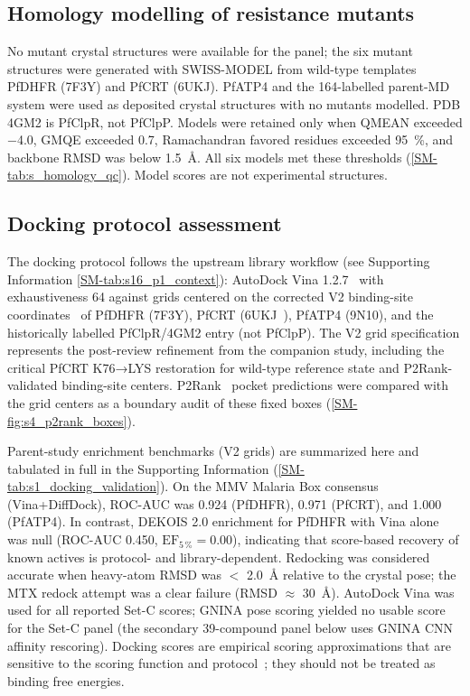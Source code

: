 \documentclass[journal=jcisd8,manuscript=article,layout=traditional]{achemso}
\begin{document}
\subsection{Homology modelling of resistance mutants}

No mutant crystal structures were available for the panel; the six mutant structures were generated with SWISS-MODEL from wild-type templates PfDHFR (7F3Y) and PfCRT (6UKJ). PfATP4 and the 164-labelled parent-MD system were used as deposited crystal structures with no mutants modelled. PDB 4GM2 is PfClpR, not PfClpP. Models were retained only when QMEAN exceeded \num{-4.0}, GMQE exceeded \num{0.7}, Ramachandran favored residues exceeded \qty{95}{\percent}, and backbone RMSD was below \qty{1.5}{\angstrom}. All six models met these thresholds (\cref{SM-tab:s_homology_qc}). Model scores are not experimental structures.

\subsection{Docking protocol assessment}

The docking protocol follows the upstream library workflow (see Supporting Information \cref{SM-tab:s16_p1_context}): AutoDock Vina 1.2.7~\citep{vina_2021} with exhaustiveness \num{64} against grids centered on the corrected V2 binding-site coordinates~\citep{Temgoua2026} of PfDHFR (7F3Y), PfCRT (6UKJ~\citep{Kim2019PfCRT}), PfATP4 (9N10), and the historically labelled PfClpR/4GM2 entry (not PfClpP). The V2 grid specification represents the post-review refinement from the companion study, including the critical PfCRT K76→LYS restoration for wild-type reference state and P2Rank-validated binding-site centers. P2Rank~\citep{Krivak2018P2Rank} pocket predictions were compared with the grid centers as a boundary audit of these fixed boxes (\cref{SM-fig:s4_p2rank_boxes}).

Parent-study enrichment benchmarks (V2 grids) are summarized here and tabulated in full in the Supporting Information (\cref{SM-tab:s1_docking_validation}). On the MMV Malaria Box consensus (Vina+DiffDock), ROC-AUC was \num{0.924} (PfDHFR), \num{0.971} (PfCRT), and \num{1.000} (PfATP4). In contrast, DEKOIS 2.0 enrichment for PfDHFR with Vina alone was null (ROC-AUC \num{0.450}, $\mathrm{EF}_{5\,\%} = \num{0.00}$), indicating that score-based recovery of known actives is protocol- and library-dependent. Redocking was considered accurate when heavy-atom RMSD was $<$ \qty{2.0}{\angstrom} relative to the crystal pose; the MTX redock attempt was a clear failure (RMSD $\approx$ \qty{30}{\angstrom}). AutoDock Vina was used for all reported Set-C scores; GNINA pose scoring yielded no usable score for the Set-C panel (the secondary 39-compound panel below uses GNINA CNN affinity rescoring). Docking scores are empirical scoring approximations that are sensitive to the scoring function and protocol~\citep{ferreira2023docking,sadybekov2023computational,kittelson2026docking}; they should not be treated as binding free energies.
\end{document}
